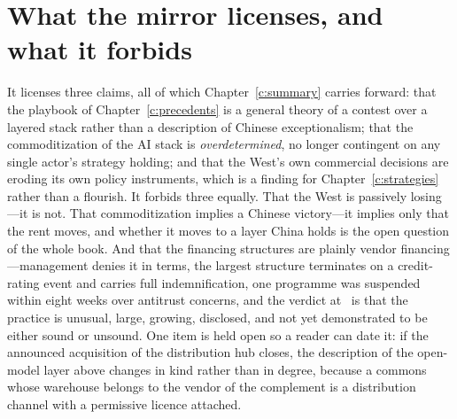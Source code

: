 \section{What the mirror licenses, and what it forbids}

It licenses three claims, all of which Chapter~\ref{c:summary} carries forward: that the playbook of Chapter~\ref{c:precedents} is a general theory of a contest over a layered stack rather than a description of Chinese exceptionalism; that the commoditization of the AI stack is \emph{overdetermined}, no longer contingent on any single actor's strategy holding; and that the West's own commercial decisions are eroding its own policy instruments, which is a finding for Chapter~\ref{c:strategies} rather than a flourish. It forbids three equally. That the West is passively losing---it is not. That commoditization implies a Chinese victory---it implies only that the rent moves, and whether it moves to a layer China holds is the open question of the whole book. And that the financing structures are plainly vendor financing---management denies it in terms, the largest structure terminates on a credit-rating event and carries full indemnification, one programme was suspended within eight weeks over antitrust concerns, and the verdict at \datafreeze\ is that the practice is unusual, large, growing, disclosed, and not yet demonstrated to be either sound or unsound. One item is held open so a reader can date it: if the announced acquisition of the distribution hub closes, the description of the open-model layer above changes in kind rather than in degree, because a commons whose warehouse belongs to the vendor of the complement is a distribution channel with a permissive licence attached.
